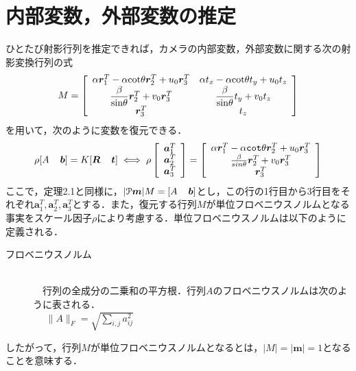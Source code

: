 \documentclass[a4paper,10pt]{jarticle}
\begin{document}
\section{内部変数，外部変数の推定}
\label{sec2}
%
ひとたび射影行列を推定できれば，カメラの内部変数，外部変数に関する次の射影変換行列の式
%
\begin{equation}
 M =
 \left[
  \begin{array}{cc}
   \alpha {\bm r}^T_1 - \alpha {\rm cot} \theta {\bm r}^T_2 + u_0 {\bm r}^T_3 & \alpha t_x - \alpha {\rm cot} \theta t_y + u_0 t_z \\
   \dfrac{\beta}{ {\rm sin} \theta} {\bm r}^T_2 + v_0 {\bm r}^T_3 & \dfrac{\beta}{ {\rm sin} \theta} t_y + v_0 t_z \\
   {\bm r}^T_3 & t_z \\
  \end{array}
 \right]
\label{equ5}
\end{equation}
%
を用いて，次のように変数を復元できる．
%
\begin{equation}
 \rho [A \hspace{4mm} {\bm b}] = K [ {\bm R} \hspace{4mm} {\bm t} ] \iff \rho \left[
  \begin{array}{c}
   {\bm a}^T_1 \\
   {\bm a}^T_2 \\
   {\bm a}^T_3 \\
  \end{array}
 \right] = \left[
  \begin{array}{c}
   \alpha {\bm r}^T_1 - \alpha \verb|cot| \theta {\bm r}^T_2 + u_0 {\bm r}^T_3 \\
   \frac{\beta}{ sin \theta} {\bm r}^T_2 + v_0 {\bm r}^T_3 \\
   {\bm r}^T_3 \\
  \end{array}
\right]
\label{equ6}
\end{equation}
%
ここで，定理2.1と同様に，$ |\mathcal{P} {\bm m}| M = [ A \hspace{4mm} {\bm b} ] $とし，この行の1行目から3行目をそれぞれ$ {\bm a}^T_1, {\bm a}^T_2, {\bm a}^T_3 $とする．また，復元する行列$ M $が単位フロベニウスノルムとなる事実をスケール因子$ \rho $により考慮する．単位フロベニウスノルムは以下のように定義される．
%
\begin{description}
 \item[フロベニウスノルム]\mbox{}\\
　行列の全成分の二乗和の平方根．行列$ A $のフロベニウスノルムは次のように表される．\\
　\hspace{5.3cm} $ \|A\|_F = \sqrt{ \displaystyle \sum_{i,j} a^2_{ij}} $
\end{description}
%
したがって，行列$ M $が単位フロベニウスノルムとなるとは，$ |M| = | {\bm m} | = 1 $となることを意味する．
\end{document}
